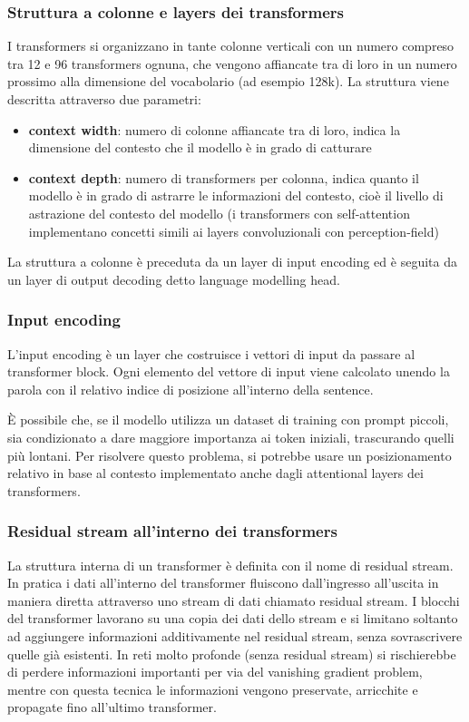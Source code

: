 \subsubsection*{Struttura a colonne e layers dei transformers}
I transformers si organizzano in tante colonne verticali con un numero compreso tra 12 e 96 transformers ognuna, che vengono
affiancate tra di loro in un numero prossimo alla dimensione del vocabolario (ad esempio 128k). La struttura viene descritta
attraverso due parametri:
\begin{itemize}
	\item \textbf{context width}: numero di colonne affiancate tra di loro, indica la dimensione del contesto che il modello
	è in grado di catturare
	\item \textbf{context depth}: numero di transformers per colonna, indica quanto il modello è in grado di astrarre le
	informazioni del contesto, cioè il livello di astrazione del contesto del modello (i transformers con self-attention
	implementano concetti simili ai layers convoluzionali con perception-field)
\end{itemize}

La struttura a colonne è preceduta da un layer di input encoding ed è seguita da un layer di output decoding detto language
modelling head.

\subsubsection*{Input encoding}
L'input encoding è un layer che costruisce i vettori di input da passare al transformer block. Ogni elemento del vettore di
input viene calcolato unendo la parola con il relativo indice di posizione all'interno della sentence.

È possibile che, se il modello utilizza un dataset di training con prompt piccoli, sia condizionato a dare maggiore importanza
ai token iniziali, trascurando quelli più lontani. Per risolvere questo problema, si potrebbe usare un posizionamento relativo
in base al contesto implementato anche dagli attentional layers dei transformers.

\subsubsection*{Residual stream all'interno dei transformers}
La struttura interna di un transformer è definita con il nome di residual stream. In pratica i dati all'interno del transformer
fluiscono dall'ingresso all'uscita in maniera diretta attraverso uno stream di dati chiamato residual stream. I blocchi del
transformer lavorano su una copia dei dati dello stream e si limitano soltanto ad aggiungere informazioni additivamente
nel residual stream, senza sovrascrivere quelle già esistenti. In reti molto profonde (senza residual stream) si rischierebbe
di perdere informazioni importanti per via del vanishing gradient problem, mentre con questa tecnica le informazioni vengono
preservate, arricchite e propagate fino all'ultimo transformer.

